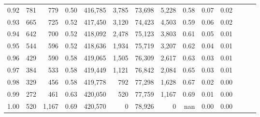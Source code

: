 \begin{tabular}{rrrrrrrrrrrrrr}
0.92 &    781 &    779 &  0.50 &  416,785 &    3,785 &  73,698 &   5,228 &  0.58 &  0.07 &      0.02 \\
0.93 &    665 &    725 &  0.52 &  417,450 &    3,120 &  74,423 &   4,503 &  0.59 &  0.06 &      0.02 \\
0.94 &    642 &    700 &  0.52 &  418,092 &    2,478 &  75,123 &   3,803 &  0.61 &  0.05 &      0.01 \\
0.95 &    544 &    596 &  0.52 &  418,636 &    1,934 &  75,719 &   3,207 &  0.62 &  0.04 &      0.01 \\
0.96 &    429 &    590 &  0.58 &  419,065 &    1,505 &  76,309 &   2,617 &  0.63 &  0.03 &      0.01 \\
0.97 &    384 &    533 &  0.58 &  419,449 &    1,121 &  76,842 &   2,084 &  0.65 &  0.03 &      0.01 \\
0.98 &    329 &    456 &  0.58 &  419,778 &      792 &  77,298 &   1,628 &  0.67 &  0.02 &      0.00 \\
0.99 &    272 &    461 &  0.63 &  420,050 &      520 &  77,759 &   1,167 &  0.69 &  0.01 &      0.00 \\
1.00 &    520 &  1,167 &  0.69 &  420,570 &        0 &  78,926 &       0 &   nan &  0.00 &      0.00 \\
\bottomrule
\end{tabular}

